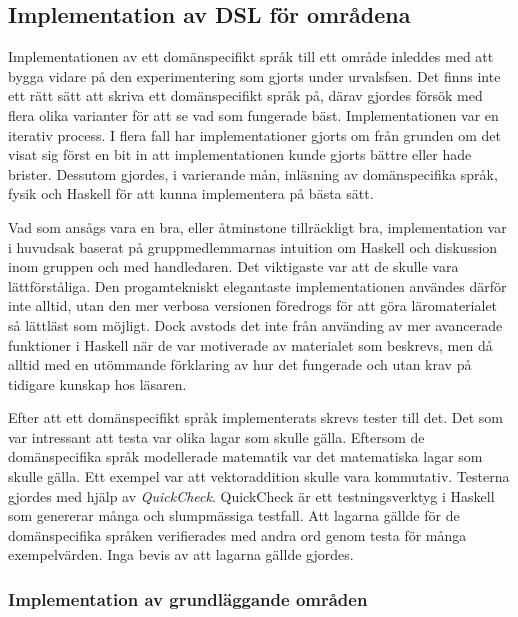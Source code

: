 \begin{draft}

\subsection{Implementation av DSL för områdena}

Implementationen av ett domänspecifikt språk till ett område inleddes med att
bygga vidare på den experimentering som gjorts under urvalsfsen. Det finns inte
ett rätt sätt att skriva ett domänspecifikt språk på, därav gjordes försök med
flera olika varianter för att se vad som fungerade bäst. Implementationen var en
iterativ process. I flera fall har implementationer gjorts om från grunden om
det visat sig först en bit in att implementationen kunde gjorts bättre eller
hade brister. Dessutom gjordes, i varierande mån, inläsning av domänspecifika
språk, fysik och Haskell för att kunna implementera på bästa sätt.

Vad som ansågs vara en bra, eller åtminstone tillräckligt bra, implementation
var i huvudsak baserat på gruppmedlemmarnas intuition om Haskell och diskussion
inom gruppen och med handledaren. Det viktigaste var att de skulle vara
lättförståliga. Den progamtekniskt elegantaste implementationen användes därför
inte alltid, utan den mer verbosa versionen föredrogs för att göra
läromaterialet så lättläst som möjligt. Dock avstods det inte från använding av
mer avancerade funktioner i Haskell när de var motiverade av materialet som
beskrevs, men då alltid med en utömmande förklaring av hur det fungerade och
utan krav på tidigare kunskap hos läsaren.

Efter att ett domänspecifikt språk implementerats skrevs tester till det. Det
som var intressant att testa var olika lagar som skulle gälla. Eftersom de
domänspecifika språk modellerade matematik var det matematiska lagar som skulle
gälla. Ett exempel var att vektoraddition skulle vara kommutativ. Testerna
gjordes med hjälp av \textit{QuickCheck}. QuickCheck är ett testningsverktyg i
Haskell som genererar många och slumpmässiga testfall. Att lagarna gällde för de
domänspecifika språken verifierades med andra ord genom testa för många
exempelvärden. Inga bevis av att lagarna gällde gjordes.

\subsubsection{Implementation av grundläggande områden}
\label{sec:grund_impl}


\end{draft}
